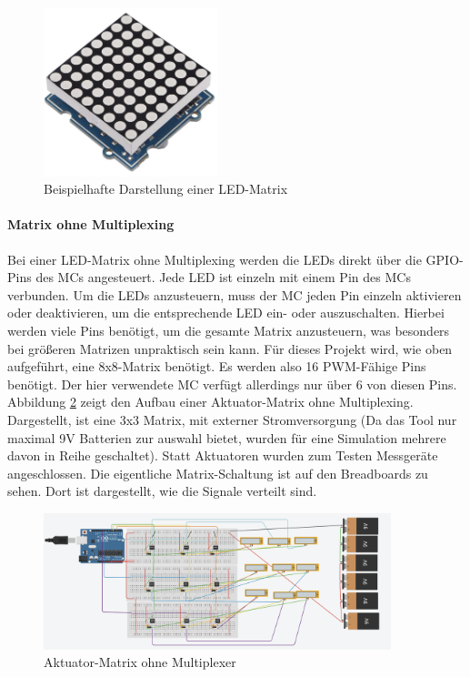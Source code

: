 \begin{figure}[htbp] %
	\centering
	\includegraphics[width=0.45\textwidth]{img/LED-Matrix}
	\caption{Beispielhafte Darstellung einer LED-Matrix}
	\label{img:LED-Matrix}
\end{figure}

\paragraph{Matrix ohne Multiplexing}

Bei einer LED-Matrix ohne Multiplexing werden die LEDs direkt über die \ac{GPIO}-Pins des
\ac{MC}s angesteuert. Jede LED ist einzeln mit einem Pin des \ac{MC}s verbunden. Um die LEDs anzusteuern,
muss der \ac{MC} jeden Pin einzeln aktivieren oder deaktivieren, um die entsprechende LED ein- oder auszuschalten.
Hierbei werden viele Pins benötigt, um die gesamte Matrix anzusteuern, was besonders bei größeren Matrizen unpraktisch
sein kann. Für dieses Projekt wird, wie oben aufgeführt, eine 8x8-Matrix benötigt. Es werden also 16 PWM-Fähige Pins
benötigt. Der hier verwendete \ac{MC} verfügt allerdings nur über 6 von diesen Pins.\newline
Abbildung \ref{fig:AktMatrix} zeigt den Aufbau einer Aktuator-Matrix ohne Multiplexing. Dargestellt, ist eine 3x3
Matrix, mit externer Stromversorgung (Da das Tool nur maximal 9V Batterien zur auswahl bietet, wurden für eine Simulation
mehrere davon in Reihe geschaltet). Statt Aktuatoren wurden zum Testen Messgeräte angeschlossen.
Die eigentliche Matrix-Schaltung ist auf den Breadboards zu sehen. Dort ist dargestellt, wie die Signale verteilt sind.
 \begin{figure}[htbp]
 	\centering
 	\includegraphics[width=0.9\textwidth]{img/AktMatrix}
 	\caption{Aktuator-Matrix ohne Multiplexer}
 	\label{fig:AktMatrix}
 \end{figure}

